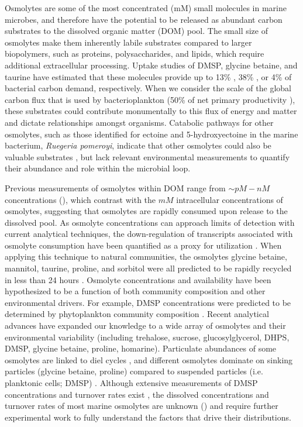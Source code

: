 \documentclass[utf8]{frontiersSCNS} %
\begin{document}
Osmolytes are some of the most concentrated (mM) small molecules in marine microbes, and therefore have the potential to be released as abundant carbon substrates to the dissolved organic matter (DOM) pool. The small size of osmolytes make them inherently labile substrates compared to larger biopolymers, such as proteins, polysaccharides, and lipids, which require additional extracellular processing. Uptake studies of DMSP, glycine betaine, and taurine have estimated that these molecules provide up to 13\% \citep{Kiene2000}, 38\% \citep{Kiene1998}, or 4\% \citep{Clifford2020} of bacterial carbon demand, respectively. When we consider the scale of the global carbon flux that is used by bacterioplankton (50\% of net primary productivity \citep{Ducklow2000}), these substrates could contribute monumentally to this flux of energy and matter and dictate relationships amongst organisms. Catabolic pathways for other osmolytes, such as those identified for ectoine and 5-hydroxyectoine in the marine bacterium, \emph{Ruegeria pomeroyi}, indicate that other osmolytes could also be valuable substrates \citep{Schulz2017}, but lack relevant environmental measurements to quantify their abundance and role within the microbial loop.

Previous measurements of osmolytes within DOM range from $\sim pM - nM$ concentrations (), which contrast with the $mM$ intracellular concentrations of osmolytes, suggesting that osmolytes are rapidly consumed upon release to the dissolved pool. As osmolyte concentrations can approach limits of detection with current analytical techniques, the down-regulation of transcripts associated with osmolyte consumption have been quantified as a proxy for utilization \citep{Vorobev2018}. When applying this technique to natural communities, the osmolytes glycine betaine, mannitol, taurine, proline, and sorbitol were all predicted to be rapidly recycled in less than 24 hours \citep{Vorobev2018}. Osmolyte concentrations and availability have been hypothesized to be a function of both community composition and other environmental drivers. For example, DMSP concentrations were predicted to be determined by phytoplankton community composition \citep{McParland2019}. Recent analytical advances have expanded our knowledge to a wide array of osmolytes and their environmental variability (including trehalose, sucrose, glucosylglycerol, DHPS, DMSP, glycine betaine, proline, homarine). Particulate abundances of some osmolytes are linked to diel cycles \citep{Boysen2020}, and different osmolytes dominate on sinking particles (glycine betaine, proline) compared to suspended particles (i.e. planktonic cells; DMSP) \citep{Johnson2020}. Although extensive measurements of DMSP concentrations and turnover rates exist \citep{Kiene2000}, the dissolved concentrations and turnover rates of most marine osmolytes are unknown  () and require further experimental work to fully understand the factors that drive their distributions.
\end{document}
